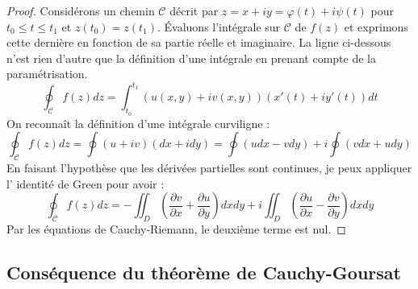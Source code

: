 \begin{proof}
Considérons un chemin $\mathcal{C}$ décrit par $z = x+iy = \varphi(t) + i\psi(t)$ pour
$t_0 \leq t \leq t_1$ et $z(t_0) = z(t_1)$. Évaluons l'intégrale sur $\mathcal{C}$ de
$f(z)$ et exprimons cette dernière en fonction de sa partie réelle et imaginaire. La 
ligne ci-dessous n'est rien d'autre que la définition d'une intégrale en prenant compte
de la paramétrisation.
\begin{equation}
\oint_\mathcal{C}f(z) dz = \int_{t_0}^{t_1} (u(x,y) + iv(x,y))(x'(t) + iy'(t)) dt
\end{equation}
On reconnaît la définition d'une intégrale curviligne :
\begin{equation}
\oint_\mathcal{C}f(z) dz = \oint (u+iv)(dx+idy) = \oint(udx - vdy) + i\oint (vdx + udy)
\end{equation}
En faisant l'hypothèse que les dérivées partielles sont continues, je peux appliquer l'
identité de Green pour avoir :
\begin{equation}
\oint_\mathcal{C}f(z) dz = -\iint_D \left(\dfrac{\partial v}{\partial x} + 
\dfrac{\partial u}{\partial y}\right) dxdy + i\iint_D\left(
\dfrac{\partial u}{\partial x} - \dfrac{\partial v}{\partial y}\right)dxdy
\end{equation}
Par les équations de Cauchy-Riemann, le deuxième terme est nul.
\end{proof}


    \subsection{Conséquence du théorème de Cauchy-Goursat}
